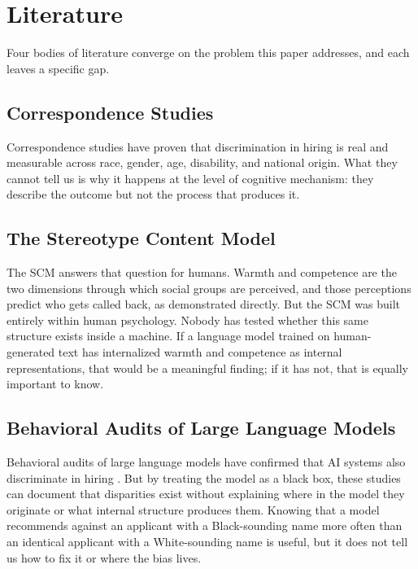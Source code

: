 \documentclass[twocolumn]{article}
\begin{document}
\section*{Literature}

Four bodies of literature converge on the problem this paper addresses,
and each leaves a specific gap.

\subsection*{Correspondence Studies}

Correspondence studies have proven that discrimination in hiring is real
and measurable across race, gender, age, disability, and national origin.
What they cannot tell us is why it happens at the level of cognitive
mechanism: they describe the outcome but not the process that produces it.

\subsection*{The Stereotype Content Model}

The SCM answers that question for humans.
Warmth and competence are the two dimensions through which social groups
are perceived, and those perceptions predict who gets called back, as
\citet{gallo2024warmth} demonstrated directly.
But the SCM was built entirely within human psychology.
Nobody has tested whether this same structure exists inside a machine.
If a language model trained on human-generated text has internalized
warmth and competence as internal representations, that would be a
meaningful finding; if it has not, that is equally important to know.

\subsection*{Behavioral Audits of Large Language Models}

Behavioral audits of large language models have confirmed that AI systems
also discriminate in hiring \citep{an2024llm, gaebler2024auditing}.
But by treating the model as a black box, these studies can document that
disparities exist without explaining where in the model they originate or
what internal structure produces them.
Knowing that a model recommends against an applicant with a Black-sounding
name more often than an identical applicant with a White-sounding name is
useful, but it does not tell us how to fix it or where the bias lives.
\end{document}
